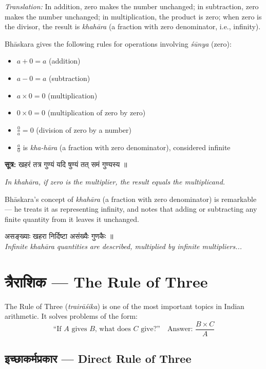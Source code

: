 \documentclass[10pt,a4paper]{article}
\newenvironment{sanskritverse}{%
  \begin{center}%
  \begin{minipage}{0.94\textwidth}%
  \centering\devanagarifont\small%
}{%
  \end{minipage}%
  \end{center}%
  \vspace{0.1em}%
}
\newcommand{\sutratxt}[2]{%
  \begin{center}%
  \colorbox{sanskritbg}{%
    \begin{minipage}{0.93\textwidth}%
    \centering\small\vspace{3pt}%
    {\devanagarifont\textbf{सूत्र:} #1}\par\vspace{2pt}%
    \textit{#2}\vspace{3pt}%
    \end{minipage}%
  }%
  \end{center}%
  \vspace{0.1em}%
}
\begin{document}
\textit{Translation:} In addition, zero makes the number unchanged; in subtraction, zero makes the number unchanged; in multiplication, the product is zero; when zero is the divisor, the result is \textit{khahāra} (a fraction with zero denominator, i.e., infinity).

Bhāskara gives the following rules for operations involving \textit{śūnya} (zero):
\begin{itemize}[leftmargin=*,itemsep=0pt]
\item $a + 0 = a$ (addition)
\item $a - 0 = a$ (subtraction)
\item $a \times 0 = 0$ (multiplication)
\item $0 \times 0 = 0$ (multiplication of zero by zero)
\item $\frac{0}{a} = 0$ (division of zero by a number)
\item $\frac{a}{0}$ is \textit{kha-hāra} (a fraction with zero denominator), considered infinite
\end{itemize}

\sutratxt{खहरं तत्र गुण्यं यदि षुण्यं तत् समं गुण्यस्य ॥}{In \textit{khahāra}, if zero is the multiplier, the result equals the multiplicand.}

Bhāskara's concept of \textit{khahāra} (a fraction with zero denominator) is remarkable --- he treats it as representing infinity, and notes that adding or subtracting any finite quantity from it leaves it unchanged.

\begin{sanskritverse}
असङ्ख्याः खहरा निर्दिष्टा असंख्यैः गुणकैः ॥\\
\textit{Infinite \textit{khahāra} quantities are described, multiplied by infinite multipliers...}
\end{sanskritverse}

\section{त्रैराशिक — The Rule of Three}
\label{sec:trairashika}

The Rule of Three (\textit{trairāśika}) is one of the most important topics in Indian arithmetic. It solves problems of the form:
\[
\text{``If } A \text{ gives } B \text{, what does } C \text{ give?''} \quad \text{Answer: } \frac{B \times C}{A}
\]

\subsection{इच्छाकर्मप्रकार — Direct Rule of Three}
\end{document}
